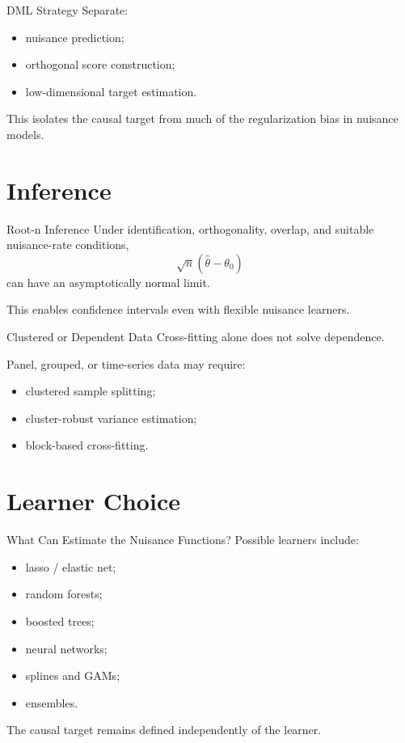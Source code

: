 \documentclass[aspectratio=169,11pt]{beamer}
\begin{document}
\begin{frame}{DML Strategy}
Separate:
\begin{itemize}
\item nuisance prediction;
\item orthogonal score construction;
\item low-dimensional target estimation.
\end{itemize}

This isolates the causal target from much of the regularization bias in nuisance models.
\end{frame}

\section{Inference}

\begin{frame}{Root-n Inference}
Under identification, orthogonality, overlap, and suitable nuisance-rate conditions,
\[
\sqrt{n}(\widehat\theta-\theta_0)
\]
can have an asymptotically normal limit.

This enables confidence intervals even with flexible nuisance learners.
\end{frame}

\begin{frame}{Clustered or Dependent Data}
Cross-fitting alone does not solve dependence.

Panel, grouped, or time-series data may require:
\begin{itemize}
\item clustered sample splitting;
\item cluster-robust variance estimation;
\item block-based cross-fitting.
\end{itemize}
\end{frame}

\section{Learner Choice}

\begin{frame}{What Can Estimate the Nuisance Functions?}
Possible learners include:
\begin{itemize}
\item lasso / elastic net;
\item random forests;
\item boosted trees;
\item neural networks;
\item splines and GAMs;
\item ensembles.
\end{itemize}

The causal target remains defined independently of the learner.
\end{frame}
\end{document}
